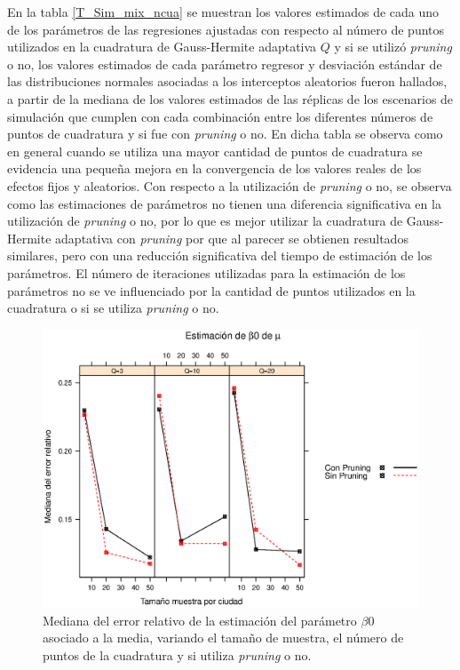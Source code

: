 En la tabla \ref{T_Sim_mix_ncua} se muestran los valores estimados de cada uno de los par\'{a}metros de las regresiones ajustadas con respecto al n\'{u}mero de puntos utilizados en la cuadratura de Gauss-Hermite adaptativa $Q$ y si se utiliz\'{o} \textit{pruning} o no, los valores estimados de cada par\'{a}metro regresor y desviaci\'{o}n est\'{a}ndar de las distribuciones normales asociadas a los interceptos aleatorios fueron hallados, a partir de la mediana de los valores estimados de las r\'{e}plicas de los escenarios de simulaci\'{o}n que cumplen con cada combinaci\'{o}n entre los diferentes n\'{u}meros de puntos de cuadratura y si fue con \textit{pruning} o no. En dicha tabla se observa como en general cuando se utiliza una mayor cantidad de puntos de cuadratura se evidencia una peque\~{n}a mejora en la convergencia de los valores reales de los efectos fijos y aleatorios. Con respecto a la utilizaci\'{o}n de \textit{pruning} o no, se observa como las estimaciones de par\'{a}metros no tienen una diferencia significativa en la utilizaci\'{o}n de \textit{pruning} o no, por lo que es mejor utilizar la cuadratura de Gauss-Hermite adaptativa con \textit{pruning} por que al parecer se obtienen resultados similares, pero con una reducci\'{o}n significativa del tiempo de estimaci\'{o}n de los par\'{a}metros. El n\'{u}mero de iteraciones utilizadas para la estimaci\'{o}n de los par\'{a}metros no se ve influenciado por la cantidad de puntos utilizados en la cuadratura o si se utiliza \textit{pruning} o no.\\

\begin{figure}
	\begin{center}
		\includegraphics[scale=0.6]{MAPE_beta0_mu.eps}	
		\caption{Mediana del error relativo de la estimaci\'{o}n del par\'{a}metro $\beta0$ asociado a la media, variando el tama\~{n}o de muestra, el n\'{u}mero de puntos de la cuadratura y si utiliza \textit{pruning} o no.}
		\label{MAPE_bo_mu}
	\end{center}
\end{figure}

